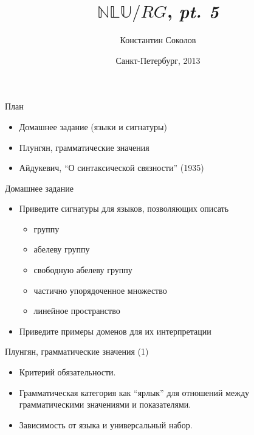 \documentclass{beamer}
\begin{document}
\title{\huge{$\mathbb{NLU}/RG$, \textit{pt. 5}}}
\author{Константин Соколов}
\date{Санкт-Петербург, 2013} 
\begin{frame}
    \thispagestyle{empty}
    \titlepage
\end{frame}

\begin{frame}{План}
    \setcounter{framenumber}{1}
    \begin{itemize}
        \item Домашнее задание (языки и сигнатуры)
        \item Плунгян, грамматические значения 
        \item Айдукевич, ``О синтаксической связности'' (1935)
    \end{itemize}
\end{frame}

\begin{frame}{Домашнее задание}
\begin{itemize}
  \item Приведите сигнатуры для языков, позволяющих описать
    \begin{itemize}
      \item группу
      \item абелеву группу
      \item свободную абелеву группу
      \item частично упорядоченное множество
      \item линейное пространство
    \end{itemize}
  \item Приведите примеры доменов для их интерпретации
\end{itemize}
\end{frame}

\begin{frame}{Плунгян, грамматические значения (1)}
\begin{itemize}
  \item Критерий обязательности.
  \item Грамматическая категория как ``ярлык'' для отношений между грамматическими значениями и показателями.
  \item Зависимость от языка и универсальный набор.
\end{itemize}
\end{frame}
\end{document}
